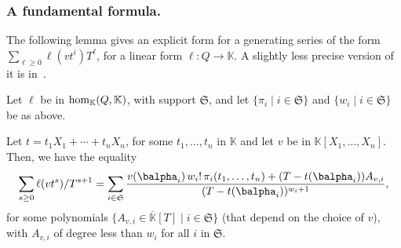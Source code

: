 \documentclass[12pt]{article}
\def\K{\mathbb{K}}
\def\K {\ensuremath{\mathbb{K}}}
\def\Kbar {{\ensuremath{\overline{\mathbb{K}}}}}
\begin{document}
\subsubsection{A fundamental formula.}  The following lemma 
gives an explicit form for a generating series of the form $\sum_{\ell
	\ge 0} \ell(v t^i)T^\ell$, for a linear form $\ell:Q \to \K$. A
slightly less precise version of it is in~\cite{BoSaSc03}.

\begin{lemma}\label{lemma:formula}
	Let $\ell$ be in ${\rm hom}_\K(Q,\K)$, with support $\mathfrak{S}$,
	and let $\{\pi_i \mid i \in \mathfrak{S}\}$ and $\{w_i \mid i \in
	\mathfrak{S}\}$ be as above.
	
	Let $t=t_1 X_1 + \cdots +t_n X_n$, for some $t_1,\dots,t_n$ in $\K$
	and let $v$ be in $\K[X_1,\dots,X_n]$. Then, we have the equality
	\begin{align}\label{eq:sumgenseries}
	\sum_{s \ge 0} \ell(v t^s)/T^{s+1} =
	\sum_{i \in \mathfrak{S}} \frac{
		v(\balpha_i)\, w_i!\, \pi_{i}(t_1,\dots,t_n)
		+ (T-t(\balpha_i))A_{v,i}}
	{(T-t(\balpha_i))^{w_{i}+1}},    
	\end{align}
	for some polynomials $\{A_{v,i} \in \Kbar[T] \mid i \in \mathfrak{S}\}$ (that
	depend on the choice of $v$), with $A_{v,i}$ of degree less than $w_i$ for all $i$ in
	$\mathfrak{S}$.
\end{lemma}
\end{document}
